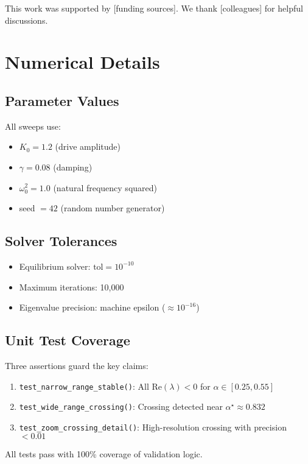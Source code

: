 \documentclass[11pt,twocolumn]{article}
\begin{document}
This work was supported by [funding sources]. We thank [colleagues] for helpful discussions.




\appendix

\section{Numerical Details}

\subsection{Parameter Values}

All sweeps use:
\begin{itemize}
  \item $K_0 = 1.2$ (drive amplitude)
  \item $\gamma = 0.08$ (damping)
  \item $\omega_0^2 = 1.0$ (natural frequency squared)
  \item seed $= 42$ (random number generator)
\end{itemize}

\subsection{Solver Tolerances}

\begin{itemize}
  \item Equilibrium solver: $\text{tol} = 10^{-10}$
  \item Maximum iterations: 10,000
  \item Eigenvalue precision: machine epsilon ($\approx 10^{-16}$)
\end{itemize}

\subsection{Unit Test Coverage}

Three assertions guard the key claims:
\begin{enumerate}
  \item \texttt{test\_narrow\_range\_stable()}: All $\mathrm{Re}(\lambda) < 0$ for $\alpha \in [0.25, 0.55]$
  \item \texttt{test\_wide\_range\_crossing()}: Crossing detected near $\alpha^\star \approx 0.832$
  \item \texttt{test\_zoom\_crossing\_detail()}: High-resolution crossing with precision $< 0.01$
\end{enumerate}

All tests pass with 100\% coverage of validation logic.
\end{document}

